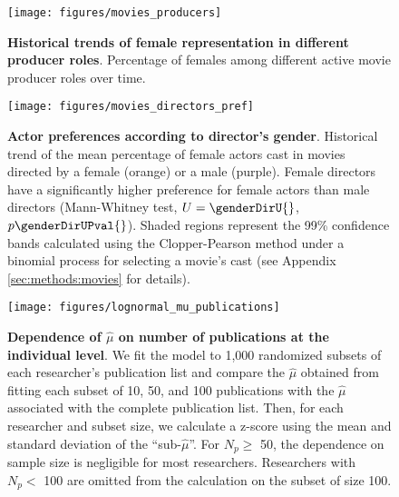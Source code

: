\clearpage

\begin{figure}[t]
\texttt{[image: figures/movies\_producers]}
\caption[Historical trends of female representation in different producer role.]{\textbf{Historical trends of female representation in different producer roles}. Percentage of females among different active movie producer roles over time.}
\label{fig:movies:producers}
\end{figure}

\clearpage

\begin{figure}[t]
\texttt{[image: figures/movies\_directors\_pref]}
\caption[Actor preferences according to director's gender.]{\textbf{Actor preferences according to director's gender}. Historical trend of the mean percentage of female actors cast in movies directed by a female (orange) or a male (purple). Female directors have a significantly higher preference for female actors than male directors (Mann-Whitney test, $U = \genderDirU{}$, $p \genderDirUPval{}$). Shaded regions represent the 99\% confidence bands calculated using the Clopper-Pearson \cite{Clopper1934} method under a binomial process for selecting a movie's cast (see Appendix \ref{sec:methods:movies} for details).}
\label{fig:movies:directors_pref}
\end{figure}

\clearpage

\begin{figure}[ht]
\texttt{[image: figures/lognormal\_mu\_publications]}
\caption[Dependence of $\hat{\mu}$ on number of publications.]{\textbf{Dependence of $\hat{\mu}$ on number of publications at the individual level}. We fit the model to 1,000 randomized subsets of each researcher's publication list and compare the $\hat{\mu}$ obtained from fitting each subset of 10, 50, and 100 publications with the $\hat{\mu}$ associated with the complete publication list. Then, for each researcher and subset size, we calculate a z-score using the mean and standard deviation of the ``sub-$\hat{\mu}$''. For $N_p \geq$ 50, the dependence on sample size is negligible for most researchers. Researchers with $N_p <$ 100 are omitted from the calculation on the subset of size 100.}
\label{fig:lognormal:mu_publications}
\end{figure}

\clearpage

